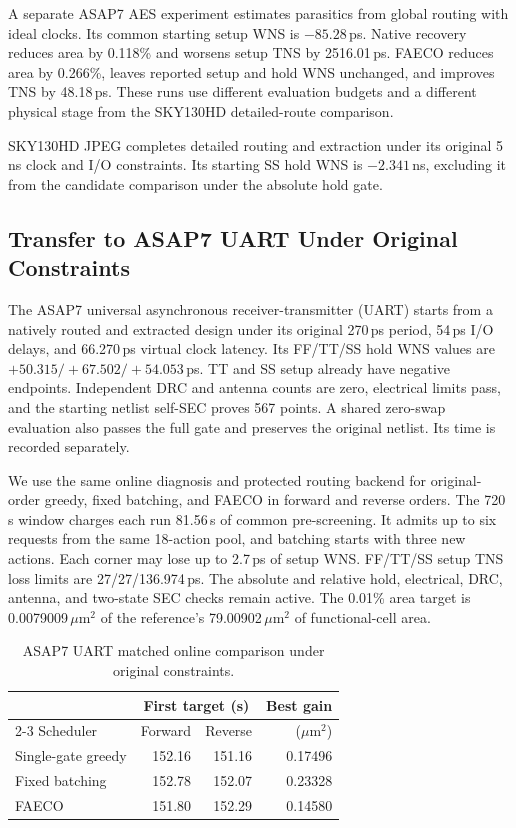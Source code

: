 \documentclass[journal]{IEEEtran}
\newcommand{\um}{\ensuremath{\mu\mathrm{m}^{2}}}
\begin{document}
A separate ASAP7 AES experiment estimates parasitics from global routing with ideal clocks. Its common starting setup WNS is \(-85.28\)\,ps. Native recovery reduces area by 0.118\% and worsens setup TNS by 2516.01\,ps. FAECO reduces area by 0.266\%, leaves reported setup and hold WNS unchanged, and improves TNS by 48.18\,ps. These runs use different evaluation budgets and a different physical stage from the SKY130HD detailed-route comparison.

SKY130HD JPEG completes detailed routing and extraction under its original 5\,ns clock and I/O constraints. Its starting SS hold WNS is \(-2.341\)\,ns, excluding it from the candidate comparison under the absolute hold gate.

\subsection{Transfer to ASAP7 UART Under Original Constraints}
\label{sec:uart}

The ASAP7 universal asynchronous receiver-transmitter (UART) starts from a natively routed and extracted design under its original 270\,ps period, 54\,ps I/O delays, and 66.270\,ps virtual clock latency. Its FF/TT/SS hold WNS values are \(+50.315/+67.502/+54.053\)\,ps. TT and SS setup already have negative endpoints. Independent DRC and antenna counts are zero, electrical limits pass, and the starting netlist self-SEC proves 567 points. A shared zero-swap evaluation also passes the full gate and preserves the original netlist. Its time is recorded separately.

We use the same online diagnosis and protected routing backend for original-order greedy, fixed batching, and FAECO in forward and reverse orders. The 720\,s window charges each run 81.56\,s of common pre-screening. It admits up to six requests from the same 18-action pool, and batching starts with three new actions. Each corner may lose up to 2.7\,ps of setup WNS. FF/TT/SS setup TNS loss limits are 27/27/136.974\,ps. The absolute and relative hold, electrical, DRC, antenna, and two-state SEC checks remain active. The 0.01\% area target is 0.0079009\,\um{} of the reference's 79.00902\,\um{} of functional-cell area.

\begin{table}[t]
\centering
\caption{ASAP7 UART matched online comparison under original constraints.}
\label{tab:uart}
\footnotesize
\begin{tabular}{lrrr}
\toprule
& \multicolumn{2}{c}{First target (s)} & Best gain\\
\cmidrule(lr){2-3}
Scheduler & Forward & Reverse & (\um)\\
\midrule
Single-gate greedy & 152.16 & 151.16 & 0.17496\\
Fixed batching & 152.78 & 152.07 & 0.23328\\
FAECO & 151.80 & 152.29 & 0.14580\\
\bottomrule
\end{tabular}
\end{table}
\end{document}
